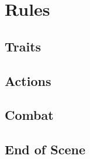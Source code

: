 \documentclass[a5paper,openany]{book}
\date{\today}
\begin{document}
\section*{Rules}

\begin{multicols}{2}

\subsection*{Traits}











\subsection*{Actions}






\subsection*{Combat}





\subsection*{End of Scene}



\end{multicols}
\end{document}
